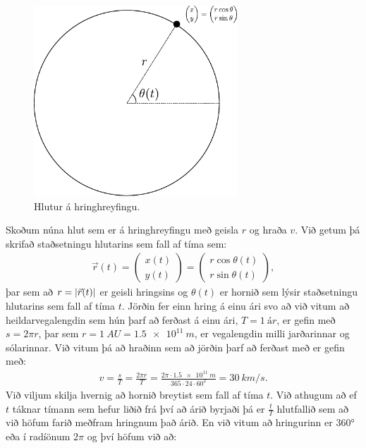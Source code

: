 \begin{minipage}{\linewidth}
\begin{figure}
\vspace{-1cm}
\includegraphics[width=3in]{figures/hringhreyfing2.pdf}
\caption{Hlutur á hringhreyfingu.}
\label{fig:fnun}
\end{figure}

Skoðum núna hlut sem er á hringhreyfingu með geisla $r$ og hraða $v$. Við getum þá skrifað staðsetningu hlutarins sem fall af tíma sem:
\begin{align*}
    \vec{r}(t) = \begin{pmatrix} x(t) \\ y(t) \end{pmatrix} = \begin{pmatrix} r\cos\theta(t) \\ r\sin\theta(t) \end{pmatrix},
\end{align*}
þar sem að $r = \abs{\vec{r}(t)}$ er geisli hringsins og $\theta(t)$ er hornið sem lýsir staðsetningu hlutarins sem fall af tíma $t$. Jörðin fer einn hring á einu ári svo að við vitum að heildarvegalengdin sem hún þarf að ferðast á einu ári, $T = \SI{1}{ár}$, er gefin með $s = 2\pi r$, þar sem $r = \SI{1}{AU} = \SI{1.5e11}{m}$, er vegalengdin milli jarðarinnar og sólarinnar. Við vitum þá að hraðinn sem að jörðin þarf að ferðast með er gefin með:
\begin{align*}
    v = \frac{s}{T} = \frac{2\pi r}{T} = \frac{2 \pi \cdot \SI{1.5e11}{m}}{365 \cdot 24 \cdot 60^2} = \SI{30}{km/s}.
\end{align*}
Við viljum skilja hvernig að hornið breytist sem fall af tíma $t$. Við athugum að ef $t$ táknar tímann sem hefur liðið frá því að árið byrjaði þá er $\frac{t}{T}$ hlutfallið sem að við höfum farið meðfram hringnum það árið. En við vitum að hringurinn er $\ang{360}$ eða í radíönum $2\pi$ og því höfum við að:
\end{minipage}

